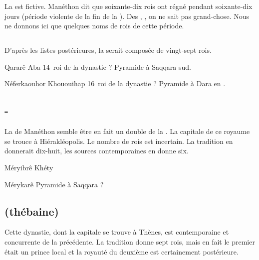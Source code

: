 La  est fictive. Manéthon dit que soixante-dix rois ont 
régné pendant soixante-dix jours (période violente de la fin de la 
).
Des , , on ne sait pas grand-chose. Nous 
ne donnons ici que quelques noms de rois de cette période.

\subsection{\texorpdfstring{}{VIIIe dynastie}}

D'après les listes postérieures, la  serait composée de 
vingt-sept rois.

\begin{listerois}
  \item [Qararê Aba] 14\ieme~roi de la dynastie ? 
        Pyramide à Saqqara sud. \\
  \item [Néferkaouhor Khououihap] 16\ieme~roi de la dynastie ? 
        Pyramide à Dara en \ME.
\end{listerois}

\subsection{\texorpdfstring{-}{IXe-Xe dynastie}}

La  de Manéthon semble être en fait un double de la 
. 
La capitale de ce royaume se trouce à Hiérakléopolis. Le nombre de 
rois est incertain. La tradition en donnerait dix-huit, les sources
contemporaines en donne six.

\begin{listerois}
  \item [Méryibrê Khéty]
  \item [Mérykarê] Pyramide à Saqqara ?
\end{listerois}

\subsection{\texorpdfstring{}{XIe dynastie} (thébaine)}

Cette dynastie, dont la capitale se trouve à Thènes, est contemporaine 
et concurrente de la précédente. La tradition donne sept rois, mais en 
fait le premier était un prince local et la royauté du deuxième est 
certainement postérieure.


